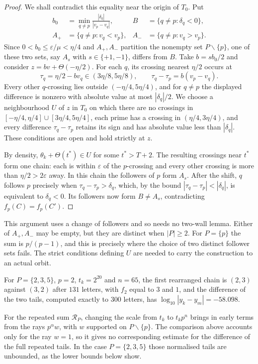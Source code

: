 \begin{proof}
We shall contradict this equality near the origin of $T_0$. Put
\[
 \begin{aligned}
 b_0&=\min_{q\ne p}\frac{|\delta_q|}{|v_p-v_q|},
 &B&=\{q\ne p:\delta_q<0\},\\
 A_+&=\{q\ne p:v_q<v_p\},
 &A_-&=\{q\ne p:v_q>v_p\}.
 \end{aligned}
\]
Since $0<b_0\le\varepsilon/\mu<\eta/4$ and $A_+,A_-$ partition the
nonempty set $P\smallsetminus\{p\}$, one of these two sets, say $A_s$ with
$s\in\{+1,-1\}$, differs from $B$. Take $b=sb_0/2$ and consider
$z=bv+\Theta(-\eta/2)$. For each $q$, its crossing nearest $\eta/2$
occurs at
\[
 \tau_q=\eta/2-bv_q\in(3\eta/8,5\eta/8),\qquad
 \tau_q-\tau_p=b(v_p-v_q).
\]
Every other $q$-crossing lies outside $(-\eta/4,5\eta/4)$, and for
$q\ne p$ the displayed difference is nonzero with absolute value at most
$|\delta_q|/2$. We choose a neighbourhood $U$ of $z$ in $T_0$ on which
there are no crossings in $[-\eta/4,\eta/4]\cup[3\eta/4,5\eta/4]$,
each prime has a crossing in $(\eta/4,3\eta/4)$, and every difference
$\tau_q-\tau_p$ retains its sign and has absolute value less than
$|\delta_q|$. These conditions are open and hold strictly at $z$.

By density, $\theta_k+\Theta(t^*)\in U$ for some $t^*>T+2$. The resulting
crossings near $t^*$ form one chain: each is within $\varepsilon$ of
the $p$-crossing and every other crossing is more than
$\eta/2>2\varepsilon$ away. In this chain the followers of $p$ form
$A_s$. After the shift, $q$ follows $p$ precisely when
$\tau_q-\tau_p>\delta_q$, which, by the bound
$|\tau_q-\tau_p|<|\delta_q|$, is equivalent to $\delta_q<0$.
Its followers now form $B\ne A_s$, contradicting $f_p(C)=f_p(C')$.
\end{proof}

This argument uses a change of followers and so needs no two-wall lemma.
Either of $A_+,A_-$ may be empty, but they are distinct when $|P|\ge2$.
For $P=\{p\}$ the sum is $p/(p-1)$, and this is precisely where the choice
of two distinct follower sets fails. The strict conditions defining $U$
are needed to carry the construction to an actual orbit.

For $P=\{2,3,5\}$, $p=2$,
$t_k=2^{20}$ and $n=65$, the first rearranged chain is $(2,3)$ against
$(3,2)$ after $131$ letters, with $f_2$ equal to $3$ and $1$, and the
difference of the two tails, computed exactly to $300$ letters, has
$\log_{10}|y_k-y_m|=-58.098$.

For the repeated sum $\mathcal R_P$, changing the scale from $t_k$ to
$t_kp^n$ brings in early terms from the rays $p^\alpha w$, with $w$
supported on $P\smallsetminus\{p\}$. The comparison above accounts only for
the ray $w=1$, so it gives no corresponding estimate for the difference
of the full repeated tails. In the case $P=\{2,3,5\}$ those normalised
tails are unbounded, as the lower bounds below show.

